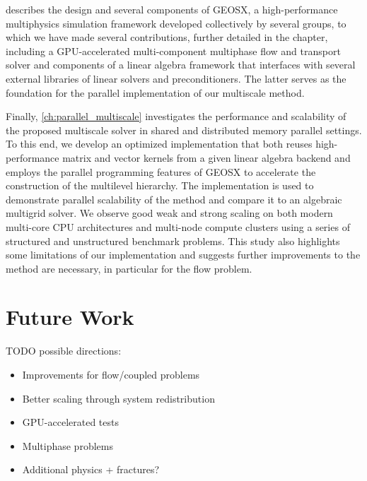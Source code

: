  describes the design and several components of GEOSX, a high-performance multiphysics simulation framework developed collectively by several groups, to which we have made several contributions, further detailed in the chapter, including a GPU-accelerated multi-component multiphase flow and transport solver and components of a linear algebra framework that interfaces with several external libraries of linear solvers and preconditioners.   The latter serves as the foundation for the parallel implementation of our multiscale method.

Finally, \cref{ch:parallel_multiscale} investigates the performance and scalability of the proposed multiscale solver in shared and distributed memory parallel settings.   To this end, we develop an optimized implementation that both reuses high-performance matrix and vector kernels from a given linear algebra backend and employs the parallel programming features of GEOSX to accelerate the construction of the multilevel hierarchy.   The implementation is used to demonstrate parallel scalability of the method and compare it to an algebraic multigrid solver.   We observe good weak and strong scaling on both modern multi-core CPU architectures and multi-node compute clusters using a series of structured and unstructured benchmark problems.   This study also highlights some limitations of our implementation and suggests further improvements to the method are necessary, in particular for the flow problem.

\section{Future Work}

TODO possible directions:
\begin{itemize}
  \item Improvements for flow/coupled problems
  \item Better scaling through system redistribution
  \item GPU-accelerated tests
  \item Multiphase problems
  \item Additional physics + fractures?
\end{itemize}